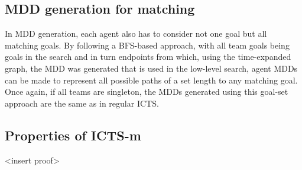\documentclass[english]{article}
\begin{document}
	\subsection{MDD generation for matching}
	In MDD generation, each agent also has to consider not one goal but all matching goals. By following a BFS-based approach, with all team goals being goals in the search and in turn endpoints from which, using the time-expanded graph, the MDD was generated that is used in the low-level search, agent MDDs can be made to represent all possible paths of a set length to any matching goal. Once again, if all teams are singleton, the MDDs generated using this goal-set approach are the same as in regular ICTS.
	
	\subsection{Properties of ICTS-m}
	<insert proof>
	\printbibliography
	
\end{document}
